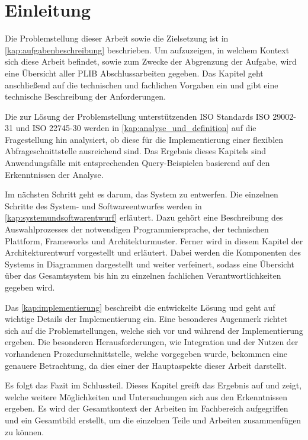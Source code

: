 
\chapter{Einleitung}\label{sec:einleitung}

Die Problemstellung dieser Arbeit sowie die Zielsetzung ist in \autoref{kap:aufgabenbeschreibung} beschrieben. Um aufzuzeigen, in welchem Kontext sich diese Arbeit befindet, sowie zum Zwecke der Abgrenzung der Aufgabe, wird eine Übersicht aller PLIB Abschlussarbeiten gegeben. Das Kapitel geht anschließend auf die technischen und fachlichen Vorgaben ein und gibt eine technische Beschreibung der Anforderungen.

Die zur Lösung der Problemstellung unterstützenden ISO Standards ISO 29002-31 und ISO 22745-30 werden in \autoref{kap:analyse_und_definition} auf die Fragestellung hin analysiert, ob diese für die Implementierung einer flexiblen \gls{Abfrageschnittstelle} ausreichend sind. Das Ergebnis dieses Kapitels sind Anwendungsfälle mit entsprechenden Query-Beispielen basierend auf den Erkenntnissen der Analyse.  

Im nächsten Schritt geht es darum, das System zu entwerfen. Die einzelnen Schritte des System- und Softwareentwurfes werden in \autoref{kap:systemundsoftwarentwurf} erläutert. Dazu gehört eine Beschreibung des Auswahlprozesses der notwendigen Programmiersprache, der technischen Plattform, Frameworks und Architekturmuster. 
Ferner wird in diesem Kapitel der Architekturentwurf vorgestellt und erläutert. Dabei werden die Komponenten des Systems in Diagrammen dargestellt und weiter verfeinert, sodass eine Übersicht über das Gesamtsystem bis hin zu einzelnen fachlichen Verantwortlichkeiten gegeben wird. 

Das \autoref{kap:implementierung} beschreibt die entwickelte Lösung und geht auf wichtige Details der Implementierung ein. Eine besonderes Augenmerk richtet sich auf die Problemstellungen, welche sich vor und während der Implementierung ergeben. Die besonderen Herausforderungen, wie Integration und der Nutzen der vorhandenen Prozedurschnittstelle, welche vorgegeben wurde, bekommen eine genauere Betrachtung, da dies einer der Hauptaspekte dieser Arbeit darstellt.

Es folgt das Fazit im Schlussteil. Dieses Kapitel greift das Ergebnis auf und zeigt, welche weitere Möglichkeiten und Untersuchungen sich aus den Erkenntnissen ergeben. Es wird der Gesamtkontext der Arbeiten im Fachbereich aufgegriffen und ein Gesamtbild erstellt, um die einzelnen Teile und Arbeiten zusammenfügen zu können. 